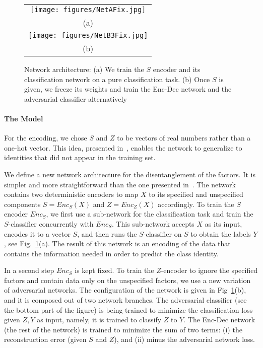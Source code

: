 \documentclass[10pt,twocolumn,letterpaper]{article}
\begin{document}
\begin{figure}[t]
  \centering
      \begin{tabular}{c}
  \texttt{[image: figures/NetAFix.jpg]} \\
    (a) \\
\texttt{[image: figures/NetB3Fix.jpg]} \\
    (b)\\
    \end{tabular}
  \caption{\label{fig0_Net} Network architecture: (a) We train the  $S$ encoder and its classification network on a pure classification task. (b) Once $S$ is given, we freeze its weights and train the Enc-Dec network and the adversarial classifier alternatively}
\end{figure}

\paragraph{The Model}
For the encoding, we chose $S$ and $Z$ to be vectors of real numbers rather than a one-hot vector. This idea, presented in~\cite{disentanglement}, enables the network to generalize to identities that did not appear in the training set.  

We define a new network architecture for the disentanglement of the factors. It is simpler and more straightforward than the one presented in~\cite{disentanglement}. The network contains two deterministic encoders to map $X$ to its specified and unspecified components $S=Enc_S(X)$ and $Z=Enc_Z(X)$ accordingly. To train the $S$ encoder $Enc_S$, we first use a sub-network for the classification task and train the $S$-classifier concurrently with $Enc_S$. This sub-network accepts $X$ as its input, encodes it to a vector $S$, and then runs the $S$-classifier on $S$ to obtain the labels $Y$, see Fig.~\ref{fig0_Net}(a). The result of this network is an encoding of the data that contains the information needed in order to predict the class identity. 

In a second step $Enc_S$ is kept fixed. To train the $Z$-encoder to ignore the specified factors and contain data only on the unspecified factors, we use a new variation of adversarial networks. The configuration of the network is given in Fig~\ref{fig0_Net}(b), and it is composed out of two network branches. The adversarial classifier (see the bottom part of the figure) is being trained to minimize the classification loss given $Z,Y$ as input, namely, it is trained to classify $Z$ to $Y$. The Enc-Dec network (the rest of the network) is trained to minimize the sum of two terms: (i) the reconstruction error (given $S$ and $Z$), and (ii) minus the adversarial network loss.
\end{document}
